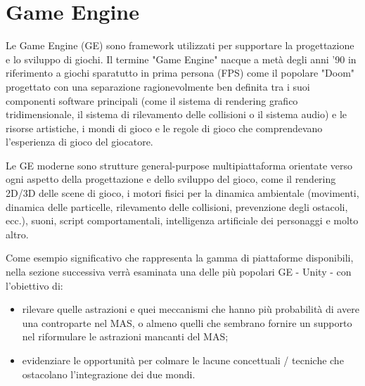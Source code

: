 \section{Game Engine}
Le Game Engine (GE) sono framework utilizzati per supportare la progettazione e lo sviluppo di giochi. Il termine "Game Engine" nacque a metà degli anni '90 in riferimento a giochi sparatutto in prima persona (FPS) come il popolare "Doom" progettato con una separazione ragionevolmente ben definita tra i suoi componenti software principali (come il sistema di rendering grafico tridimensionale, il sistema di rilevamento delle collisioni o il sistema audio) e le risorse artistiche, i mondi di gioco e le regole di gioco che comprendevano l'esperienza di gioco del giocatore.

\medskip

Le GE moderne sono strutture general-purpose multipiattaforma orientate verso ogni aspetto della progettazione e dello sviluppo del gioco, come il rendering 2D/3D delle scene di gioco, i motori fisici per la dinamica ambientale (movimenti, dinamica delle particelle, rilevamento delle collisioni, prevenzione degli ostacoli, ecc.), suoni, script comportamentali, intelligenza artificiale dei personaggi e molto altro.

\medskip

Come esempio significativo che rappresenta la gamma di piattaforme disponibili, nella sezione successiva verrà esaminata una delle più popolari GE - Unity\cite{unity} - con l'obiettivo di:
\begin{itemize}
    \item rilevare quelle astrazioni e quei meccanismi che hanno più probabilità di avere una controparte nel MAS, o almeno quelli che sembrano fornire un supporto nel riformulare le astrazioni mancanti del MAS;
    \item evidenziare le opportunità per colmare le lacune concettuali / tecniche che ostacolano l'integrazione dei due mondi.
\end{itemize}
